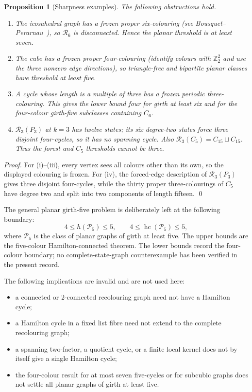 \documentclass[11pt]{article}
\newtheorem{proposition}[theorem]{Proposition}
\theoremstyle{remark}
\newcommand{\R}{\mathcal R}
\newcommand{\hc}{\operatorname{hc}}
\numberwithin{equation}{section}
\numberwithin{table}{section}
\begin{document}
\begin{proposition}[Sharpness examples]
\label{prop:sharpness}
The following obstructions hold.
\begin{enumerate}[label=(\roman*)]
\item The icosahedral graph has a frozen proper six-colouring (see Bousquet--Perarnau~\cite{BP16}), so $\R_6$ is disconnected.  Hence the planar threshold is at least seven.
\item The cube has a frozen proper four-colouring (identify colours with $\mathbb Z_2^2$ and use the three nonzero edge directions), so triangle-free and bipartite planar classes have threshold at least five.
\item A cycle whose length is a multiple of three has a frozen periodic three-colouring.  This gives the lower bound four for girth at least six and for the four-colour girth-five subclasses containing $C_6$.
\item $\R_3(P_3)$ at $k=3$ has twelve states; its six degree-two states force three disjoint four-cycles, so it has no spanning cycle.  Also $\R_3(C_5)=C_{15}\sqcup C_{15}$.  Thus the forest and $C_5$ thresholds cannot be three.
\end{enumerate}
\end{proposition}

\begin{proof}
For (i)--(iii), every vertex sees all colours other than its own, so the displayed colouring is frozen.  For (iv), the forced-edge description of $\R_3(P_3)$ gives three disjoint four-cycles, while the thirty proper three-colourings of $C_5$ have degree two and split into two components of length fifteen. \qed
\end{proof}

The general planar girth-five problem is deliberately left at the following boundary:
\[
 4\le h(\mathcal P_5)\le5,\qquad
 4\le\hc(\mathcal P_5)\le5,
\]
where $\mathcal P_5$ is the class of planar graphs of girth at least five.  The upper bounds are the five-colour Hamilton-connected theorem.  The lower bounds record the four-colour boundary; no complete-state-graph counterexample has been verified in the present record.

The following implications are invalid and are not used here:
\begin{itemize}
\item a connected or 2-connected recolouring graph need not have a Hamilton cycle;
\item a Hamilton cycle in a fixed list fibre need not extend to the complete recolouring graph;
\item a spanning two-factor, a quotient cycle, or a finite local kernel does not by itself give a single Hamilton cycle;
\item the four-colour result for at most seven five-cycles or for subcubic graphs does not settle all planar graphs of girth at least five.
\end{itemize}
\end{document}
